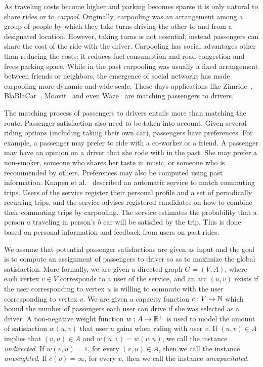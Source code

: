 
As traveling costs become higher and parking becomes sparse it is only
natural to share rides or to \emph{carpool}.  Originally, carpooling
was an arrangement among a group of people by which they take turns
driving the other to and from a designated location.  However, taking
turns is not essential, instead passengers can share the cost of the
ride with the driver.  Carpooling has social advantages other than
reducing the costs: it reduces fuel consumption and road congestion
and frees parking space.  
%
While in the past carpooling was usually a fixed arrangement between
friends or neighbors, the emergence of social networks has made
carpooling more dynamic and wide scale.  These days applications like
Zimride~\cite{zimride}, BlaBlaCar~\cite{blablacar},
Moovit~\cite{moovit} and even Waze~\cite{waze} are matching passengers
to drivers.

The matching process of passengers to drivers entails more than
matching the route.  Passenger satisfaction also need to be taken into
account.
%
Given several riding options (including taking their own car),
passengers have preferences.  For example, a passenger may prefer to
ride with a co-worker or a friend.  A passenger may have an opinion on
a driver that she rode with in the past.  She may prefer a non-smoker,
someone who shares her taste in music, or someone who is recommended
by others.
%
Preferences may also be computed using past information.  Knapen et
al.~\cite{knapen2013estimating} described an automatic service to
match commuting trips.  Users of the service register their personal
profile and a set of periodically recurring trips, and the service
advises registered candidates on how to combine their commuting trips
by carpooling.  The service estimates the probability that a person
$a$ traveling in person's $b$ car will be satisfied by the trip.  This
is done based on personal information and feedback from users on past
rides.

We assume that potential passenger satisfactions are given as input
and the goal is to compute an assignment of passengers to driver so as
to maximize the global satisfaction.
%
More formally, we are given a directed graph $G = (V, A)$, where each
vertex $v \in V$ corresponds to a user of the service, and an arc $(u,
v)$ exists if the user corresponding to vertex $u$ is willing to
commute with the user corresponding to vertex $v$.  We are given a
capacity function $c: V \rightarrow \mathbb{N}$ which bound the number of
passengers each user can drive if she was selected as a driver.  A
non-negative weight function $w : A \rightarrow \mathbb{R}^+$ is used to model
the amount of satisfaction $w(u,v)$ that user $u$ gains when riding
with user $v$.
%
If $(u,v) \in A$ implies that $(v,u) \in A$ and $w(u,v) = w(v,u)$, we
call the instance \emph{undirected}.  If $w(v,u) = 1$, for every
$(v,u) \in A$, then we call the instance
\emph{unweighted}.  If $c(v) = \infty$, for every $v$, then we
call the instance \emph{uncapacitated}.

